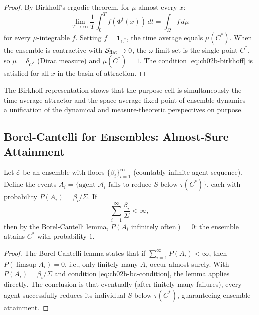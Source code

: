 \begin{proof}
By Birkhoff's ergodic theorem, for $\mu$-almost every $x$:
\[
  \lim_{T \to \infty} \frac{1}{T} \int_0^T f(\Phi^t(x))\, dt
  = \int_\Omega f\, d\mu
\]
for every $\mu$-integrable $f$.  Setting $f = \mathbf{1}_{C^*}$, the
time average equals $\mu(C^*)$.  When the ensemble is contractive with
$\mathcal{S}_{\mathrm{flat}} \to 0$, the $\omega$-limit set is the single point
$C^*$, so $\mu = \delta_{C^*}$ (Dirac measure) and $\mu(C^*) = 1$.  The
condition \eqref{eq:ch02b-birkhoff} is satisfied for all $x$ in the basin
of attraction.
\end{proof}

The Birkhoff representation shows that the purpose cell is simultaneously
the time-average attractor and the space-average fixed point of ensemble
dynamics — a unification of the dynamical and measure-theoretic perspectives
on purpose.

\subsection{Borel-Cantelli for Ensembles: Almost-Sure Attainment}

\begin{theorem}
\label{thm:ch02b-borel-cantelli}
Let $\mathcal{E}$ be an ensemble with floors $\{\beta_i\}_{i=1}^\infty$
(countably infinite agent sequence).  Define the events
$A_i = \{\text{agent } \mathcal{A}_i \text{ fails to reduce } S \text{ below } \tau(C^*)\}$,
each with probability $P(A_i) = \beta_i / \Sigma$.  If
\begin{equation}
  \sum_{i=1}^\infty \frac{\beta_i}{\Sigma} < \infty,
  \label{eq:ch02b-bc-condition}
\end{equation}
then by the Borel-Cantelli lemma, $P(A_i \text{ infinitely often}) = 0$:
the ensemble attains $C^*$ with probability $1$.
\end{theorem}

\begin{proof}
The Borel-Cantelli lemma states that if $\sum_{i=1}^\infty P(A_i) < \infty$,
then $P(\limsup A_i) = 0$, i.e., only finitely many $A_i$ occur almost surely.
With $P(A_i) = \beta_i / \Sigma$ and condition \eqref{eq:ch02b-bc-condition},
the lemma applies directly.  The conclusion is that eventually (after finitely
many failures), every agent successfully reduces its individual $S$ below
$\tau(C^*)$, guaranteeing ensemble attainment.
\end{proof}

